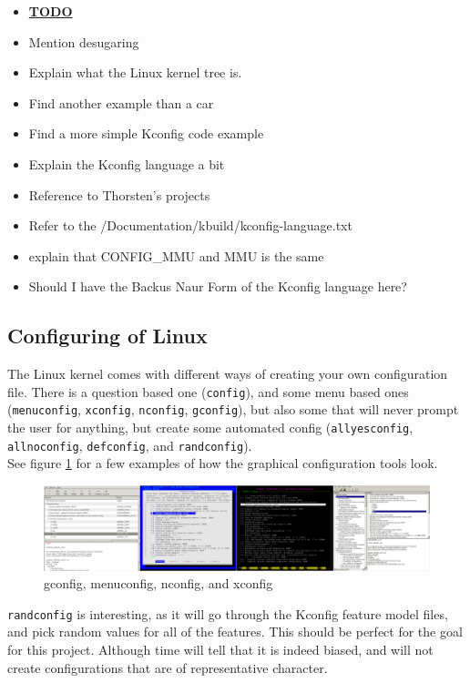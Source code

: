 \documentclass[a4paper,11pt]{report}
\newcommand{\figa}{
    \begin{figure}[!htpb]
    \centering
}
\newcommand{\figb}[2]{
    \caption{#1}
    \label{#2}
    \end{figure}
}
\begin{document}
\begin{itemize}
    \item \underline{\textbf{TODO}}
    \item Mention desugaring
    \item Explain what the Linux kernel tree is.
    \item Find another example than a car
    \item Find a more simple Kconfig code example
    \item Explain the Kconfig language a bit
    \item Reference to Thorsten's projects
    \item Refer to the /Documentation/kbuild/kconfig-language.txt
    \item explain that CONFIG\_MMU and MMU is the same
    \item Should I have the Backus Naur Form of the Kconfig language here?
\end{itemize}

\subsection{Configuring of Linux}

The Linux kernel comes with different ways of creating your own configuration 
file. There is a question based one (\texttt{config}), and some menu based ones 
(\texttt{menuconfig}, \texttt{xconfig}, \texttt{nconfig}, \texttt{gconfig}), 
but also some that will never prompt the user for anything, but create some 
automated config (\texttt{allyesconfig}, \texttt{allnoconfig}, 
\texttt{defconfig}, and \texttt{randconfig}).
\\

See figure \ref{fig:lineofconfigs} for a few examples of how the graphical 
configuration tools look.
\\


\figa
    \includegraphics[scale=0.25]{pngs/configs50percent.png}
\figb{gconfig, menuconfig, nconfig, and xconfig}{fig:lineofconfigs}

\texttt{randconfig} is interesting, as it will go through the 
Kconfig feature model files, and pick random values for all of the features. 
This should be perfect for the goal for this project. Although time will tell 
that it is indeed biased, and will not create configurations that are of 
representative character. 
\end{document}
